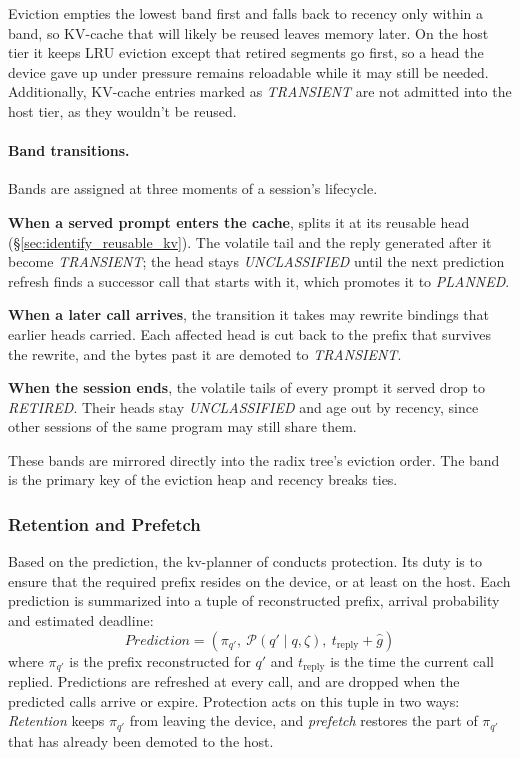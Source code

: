 Eviction empties the lowest band first and falls back to recency only within a band, so KV-cache that will likely be reused leaves memory later. On the host tier it keeps LRU eviction except that retired segments go first, so a head the device gave up under pressure remains reloadable while it may still be needed. Additionally, KV-cache entries marked as \emph{TRANSIENT} are not admitted into the host tier, as they wouldn't be reused.  

\paragraph{Band transitions.}
Bands are assigned at three moments of a session's lifecycle.
\begin{enumerate*}[label=(\arabic*)]
    \item \textbf{When a served prompt enters the cache}, \sysname splits it at its reusable head (\S\ref{sec:identify_reusable_kv}). The volatile tail and the reply generated after it become \emph{TRANSIENT}; the head stays \emph{UNCLASSIFIED} until the next prediction refresh finds a successor call that starts with it, which promotes it to \emph{PLANNED}.
    \item \textbf{When a later call arrives}, the transition it takes may rewrite bindings that earlier heads carried. Each affected head is cut back to the prefix that survives the rewrite, and the bytes past it are demoted to \emph{TRANSIENT}.
    \item \textbf{When the session ends}, the volatile tails of every prompt it served drop to \emph{RETIRED}. Their heads stay \emph{UNCLASSIFIED} and age out by recency, since other sessions of the same program may still share them.
\end{enumerate*}

These bands are mirrored directly into the radix tree's eviction order. The band is the primary key of the eviction heap and recency breaks ties.

\subsubsection{Retention and Prefetch}
Based on the prediction, the kv-planner of \sysname conducts protection. Its duty is to ensure that the required prefix resides on the device, or at least on the host. Each prediction is summarized into a tuple of reconstructed prefix, arrival probability and estimated deadline:
\[
\textit{Prediction}=\left(\pi_{q'},\ \mathcal{P}(q'\mid q,\zeta),\ t_{\mathrm{reply}}+\hat{g}\right)
\]
where $\pi_{q'}$ is the prefix reconstructed for $q'$ and $t_{\mathrm{reply}}$ is the time the current call replied. Predictions are refreshed at every call, and are dropped when the predicted calls arrive or expire. Protection acts on this tuple in two ways: \emph{Retention} keeps $\pi_{q'}$ from leaving the device, and \emph{prefetch} restores the part of $\pi_{q'}$ that has already been demoted to the host.

